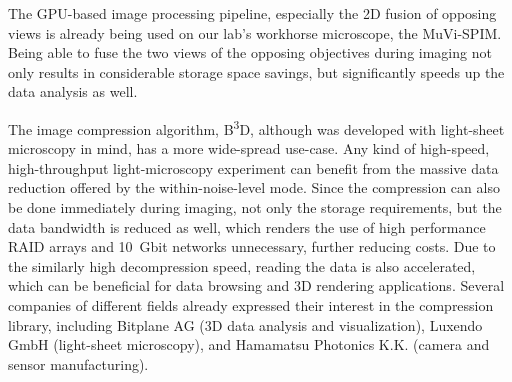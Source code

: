 \documentclass{booklet_style}
\def\b3d{B\textsuperscript{3}D}
\begin{document}
The GPU-based image processing pipeline, especially the 2D fusion of opposing views is already being used on our lab's workhorse microscope, the MuVi-SPIM. Being able to fuse the two views of the opposing objectives during imaging not only results in considerable storage space savings, but significantly speeds up the data analysis as well.

The image compression algorithm, \b3d, although was developed with light-sheet microscopy in mind, has a more wide-spread use-case. Any kind of high-speed, high-throughput light-microscopy experiment can benefit from the massive data reduction offered by the within-noise-level mode. Since the compression can also be done immediately during imaging, not only the storage requirements, but the data bandwidth is reduced as well, which renders the use of high performance RAID arrays and \SI{10}{Gbit} networks unnecessary, further reducing costs.
Due to the similarly high decompression speed, reading the data is also accelerated, which can be beneficial for data browsing and 3D rendering applications. Several companies of different fields already expressed their interest in the compression library, including Bitplane AG (3D data analysis and visualization), Luxendo GmbH (light-sheet microscopy), and Hamamatsu Photonics K.K. (camera and sensor manufacturing).





\printbibliography[category=journal, title={The author's publications}, heading=secbib]

\nocite{jakus_genetic_2010,gyorffy_recurrenceonline:_2011,shi_combined_2014}
\printbibliography[category=others, title={The author's others publications}, heading=secbib, resetnumbers=5]

\printbibliography[category=conference, title={The author's conference presentations}, heading=secbib]

\newrefcontext
\printbibliography[notcategory=journal,notcategory=conference,notcategory=others, resetnumbers=true, title={References cited in the thesis}, heading=secbib]


\end{document}
